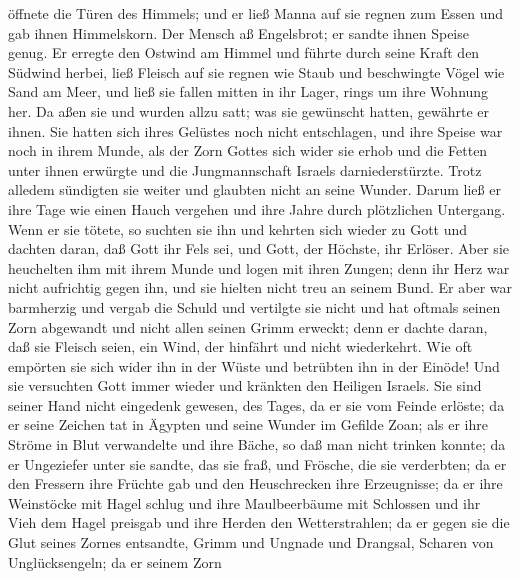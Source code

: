 öffnete die Türen des Himmels;  und er ließ Manna auf sie
regnen zum Essen und gab ihnen Himmelskorn.  Der Mensch
aß Engelsbrot; er sandte ihnen Speise genug.  Er erregte
den Ostwind am Himmel und führte durch seine Kraft den Südwind herbei,
 ließ Fleisch auf sie regnen wie Staub und beschwingte
Vögel wie Sand am Meer,  und ließ sie fallen mitten in
ihr Lager, rings um ihre Wohnung her.  Da aßen sie und
wurden allzu satt; was sie gewünscht hatten, gewährte er ihnen.
 Sie hatten sich ihres Gelüstes noch nicht entschlagen,
und ihre Speise war noch in ihrem Munde,  als der Zorn
Gottes sich wider sie erhob und die Fetten unter ihnen erwürgte und die
Jungmannschaft Israels darniederstürzte.  Trotz alledem
sündigten sie weiter und glaubten nicht an seine Wunder. 
Darum ließ er ihre Tage wie einen Hauch vergehen und ihre Jahre durch
plötzlichen Untergang.  Wenn er sie tötete, so suchten
sie ihn und kehrten sich wieder zu Gott  und dachten
daran, daß Gott ihr Fels sei, und Gott, der Höchste, ihr Erlöser.
 Aber sie heuchelten ihm mit ihrem Munde und logen mit
ihren Zungen;  denn ihr Herz war nicht aufrichtig gegen
ihn, und sie hielten nicht treu an seinem Bund.  Er aber
war barmherzig und vergab die Schuld und vertilgte sie nicht und hat
oftmals seinen Zorn abgewandt und nicht allen seinen Grimm erweckt;
 denn er dachte daran, daß sie Fleisch seien, ein Wind,
der hinfährt und nicht wiederkehrt.  Wie oft empörten sie
sich wider ihn in der Wüste und betrübten ihn in der Einöde!
 Und sie versuchten Gott immer wieder und kränkten den
Heiligen Israels.  Sie sind seiner Hand nicht eingedenk
gewesen, des Tages, da er sie vom Feinde erlöste;  da er
seine Zeichen tat in Ägypten und seine Wunder im Gefilde Zoan;
 als er ihre Ströme in Blut verwandelte und ihre Bäche,
so daß man nicht trinken konnte;  da er Ungeziefer unter
sie sandte, das sie fraß, und Frösche, die sie verderbten;
 da er den Fressern ihre Früchte gab und den Heuschrecken
ihre Erzeugnisse;  da er ihre Weinstöcke mit Hagel schlug
und ihre Maulbeerbäume mit Schlossen  und ihr Vieh dem
Hagel preisgab und ihre Herden den Wetterstrahlen;  da er
gegen sie die Glut seines Zornes entsandte, Grimm und Ungnade und
Drangsal, Scharen von Unglücksengeln;  da er seinem Zorn
